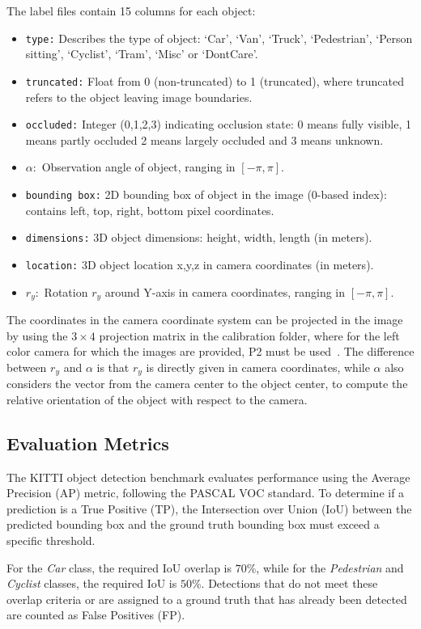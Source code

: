 The label files contain 15 columns for each object:
\begin{itemize}
    \item \texttt{type:} Describes the type of object: ‘Car’, ‘Van’, ‘Truck’, ‘Pedestrian’, ‘Person sitting’, ‘Cyclist’, ‘Tram’, ‘Misc’ or ‘DontCare’.
    \item \texttt{truncated:} Float from 0 (non-truncated) to 1 (truncated), where truncated refers to the object leaving image boundaries.
    \item \texttt{occluded:} Integer (0,1,2,3) indicating occlusion state: 0 means fully visible, 1 means partly occluded 2 means largely occluded and 3 means unknown.
    \item $\alpha:$ Observation angle of object, ranging in $\left[-\pi,\pi\right]$.
    \item \texttt{bounding box:} 2D bounding box of object in the image (0-based index): contains left, top, right, bottom pixel coordinates.
    \item \texttt{dimensions:} 3D object dimensions: height, width, length (in meters).
    \item \texttt{location:} 3D object location x,y,z in camera coordinates (in meters).
    \item $r_y:$ Rotation $r_y$ around Y-axis in camera coordinates, ranging in $\left[-\pi,\pi\right]$.
\end{itemize}
The coordinates in the camera coordinate system can be projected in the image by using the $3\times 4$ projection matrix in the calibration folder, where for the left color camera for which the
images are provided, P2 must be used~\cite{KITTI}. The difference between $r_y$ and $\alpha$ is that $r_y$ is directly
given in camera coordinates, while $\alpha$ also considers the vector from the camera center to the
object center, to compute the relative orientation of the object with respect to the camera.
\subsection{Evaluation Metrics}

The KITTI object detection benchmark evaluates performance using the Average Precision (AP) metric, following the PASCAL VOC standard. To determine if a prediction is a True Positive (TP), the Intersection over Union (IoU) between the predicted bounding box and the ground truth bounding box must exceed a specific threshold. 

For the \textit{Car} class, the required IoU overlap is $70\%$, while for the \textit{Pedestrian} and \textit{Cyclist} classes, the required IoU is $50\%$. Detections that do not meet these overlap criteria or are assigned to a ground truth that has already been detected are counted as False Positives (FP).

